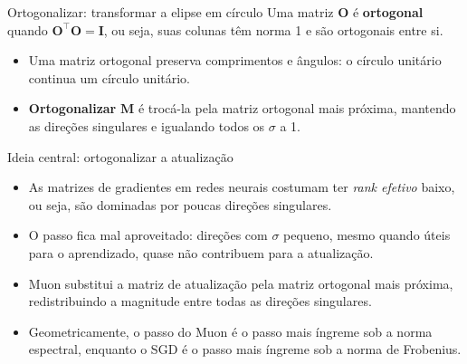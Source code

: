 \documentclass[aspectratio=169,xcolor=dvipsnames]{beamer}
\begin{document}
  \begin{frame}{Ortogonalizar: transformar a elipse em círculo}
    Uma matriz $\mathbf{O}$ é \textbf{ortogonal} quando $\mathbf{O}^{\top}\mathbf{O}=\mathbf{I}$, ou seja, suas colunas têm norma 1 \alert{e} são ortogonais entre si.
    \vfill
    \centering
    \vfill
    \raggedright
    \begin{itemize}
      \item Uma matriz ortogonal preserva comprimentos e ângulos: o círculo unitário continua um círculo unitário.
      \item \textbf{Ortogonalizar} $\mathbf{M}$ é trocá-la pela matriz ortogonal mais próxima, mantendo as direções singulares e igualando todos os $\sigma$ a 1.
    \end{itemize}
  \end{frame}

  \begin{frame}{Ideia central: ortogonalizar a atualização}
    \begin{itemize}
      \item As matrizes de gradientes em redes neurais costumam ter \textit{rank efetivo}
        baixo, ou seja, são dominadas por poucas direções singulares.
      \item O passo fica mal aproveitado: direções com $\sigma$ pequeno, mesmo quando úteis
        para o aprendizado, quase não contribuem para a atualização.
      \item Muon substitui a matriz de atualização pela \alert{matriz ortogonal mais próxima},
        redistribuindo a magnitude entre todas as direções singulares.
      \item Geometricamente, o passo do Muon é o passo mais íngreme sob a norma
        espectral, enquanto o SGD é o passo mais íngreme sob a norma de Frobenius.
    \end{itemize}
  \end{frame}
\end{document}
